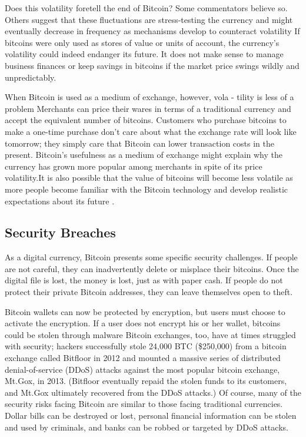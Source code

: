 Does this volatility foretell the end of Bitcoin? Some commentators
believe so. Others suggest that these fluctuations
are stress-testing the currency and might eventually decrease
in frequency as mechanisms develop to counteract volatility
If bitcoins were only used as stores of value or units of account,
the currency’s volatility could indeed endanger its future. It does
not make sense to manage business finances or keep savings in
bitcoins if the market price swings wildly and unpredictably.

When Bitcoin is used as a medium of exchange, however, vola -
tility is less of a problem Merchants can price their wares in
terms of a traditional currency and accept the equivalent number
of bitcoins. Customers who purchase bitcoins to make a one-time
purchase don’t care about what the exchange rate will look like
tomorrow; they simply care that Bitcoin can lower transaction
costs in the present. Bitcoin’s usefulness as a medium of exchange
might explain why the currency has grown more popular among
merchants in spite of its price volatility.It is also possible that
the value of bitcoins will become less volatile as more people
become familiar with the Bitcoin technology and develop realistic
expectations about its future\cite{luther2013cryptocurrencies} .

\subsection{Security Breaches}
As a digital currency, Bitcoin presents some specific security challenges.
If people are not careful, they can inadvertently delete
or misplace their bitcoins. Once the digital file is lost, the money
is lost, just as with paper cash. If people do not protect their private
Bitcoin addresses, they can leave themselves open to theft\cite{kaplanov2012nerdy}.

Bitcoin wallets can now be protected by encryption, but users
must choose to activate the encryption. If a user does not encrypt
his or her wallet, bitcoins could be stolen through malware
Bitcoin exchanges, too, have at times struggled with security;
hackers successfully stole 24,000 BTC (\$250,000) from a bitcoin
exchange called Bitfloor in 2012 and mounted a massive series
of distributed denial-of-service (DDoS) attacks against the most
popular bitcoin exchange, Mt.Gox, in 2013. (Bitfloor eventually
repaid the stolen funds to its customers, and Mt.Gox ultimately
recovered from the DDoS attacks.) Of course, many of the security
risks facing Bitcoin are similar to those facing traditional currencies.
Dollar bills can be destroyed or lost, personal financial
information can be stolen and used by criminals, and banks can
be robbed or targeted by DDoS attacks\cite{kaplanov2012nerdy}.

